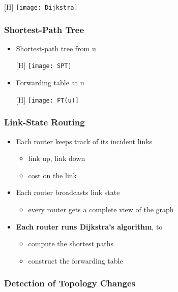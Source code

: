 \documentclass[../resumosRCOM.tex]{subfiles}
\begin{document}
\begin{center}[H]
\texttt{[image: Dijkstra]}
\end{center}

\subsubsection{Shortest-Path Tree}

\begin{itemize}
    \item Shortest-path tree from u
    \begin{center}[H]
        \texttt{[image: SPT]}
    \end{center}
    \item Forwarding table at u
    \begin{center}[H]
        \texttt{[image: FT(u)]}
    \end{center}
\end{itemize}

\subsubsection{Link-State Routing}

\begin{itemize}
    \item Each router keeps track of its incident links
    \begin{itemize}
        \item link up, link down
        \item cost on the link
    \end{itemize}
    \item Each router broadcasts link state
    \begin{itemize}
        \item every router gets a complete view of the graph
    \end{itemize}
    \item \textbf{Each router runs Dijkstra’s algorithm}, to
    \begin{itemize}
        \item compute the shortest paths
        \item construct the forwarding table
    \end{itemize}
\end{itemize}

\subsubsection{Detection of Topology Changes}
\end{document}

